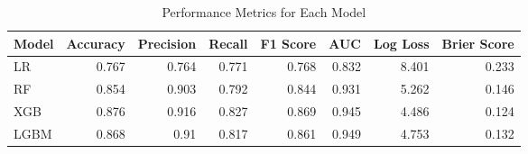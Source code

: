 \begin{table}[H]\centering
\caption{Performance Metrics for Each Model}
\label{Table 3 :performance_metrics}
\begin{tabular}{lrrrrrrr}
\toprule
Model & Accuracy & Precision & Recall & F1 Score & AUC & Log Loss & Brier Score \\
\midrule
LR & 0.767 & 0.764 & 0.771 & 0.768 & 0.832 & 8.401 & 0.233 \\
RF & 0.854 & 0.903 & 0.792 & 0.844 & 0.931 & 5.262 & 0.146 \\
XGB & 0.876 & 0.916 & 0.827 & 0.869 & 0.945 & 4.486 & 0.124 \\
LGBM & 0.868 & 0.91 & 0.817 & 0.861 & 0.949 & 4.753 & 0.132 \\
\bottomrule
\end{tabular}
\end{table}
